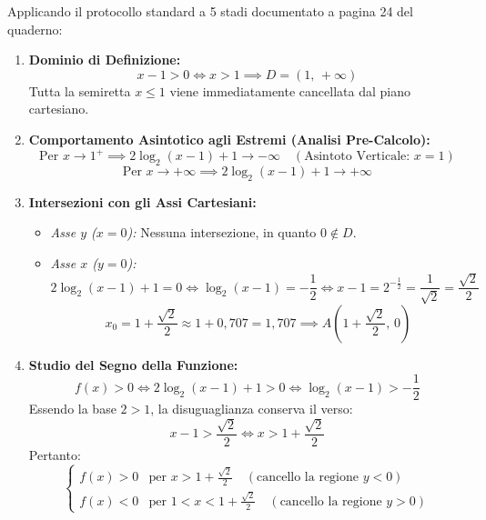 \documentclass[11pt,a4paper,oneside]{report}
\begin{document}
Applicando il protocollo standard a 5 stadi documentato a pagina 24 del quaderno:
\begin{enumerate}
\item \textbf{Dominio di Definizione:}
\begin{equation}
x - 1 > 0 \iff x > 1 \implies D = (1, \, +\infty)
\end{equation}
Tutta la semiretta $x \le 1$ viene immediatamente cancellata dal piano cartesiano.

\item \textbf{Comportamento Asintotico agli Estremi (Analisi Pre-Calcolo):}
\begin{equation}
\text{Per } x \to 1^+ \implies 2\log_2(x - 1) + 1 \to -\infty \quad (\text{Asintoto Verticale: } x = 1)
\end{equation}
\begin{equation}
\text{Per } x \to +\infty \implies 2\log_2(x - 1) + 1 \to +\infty
\end{equation}

\item \textbf{Intersezioni con gli Assi Cartesiani:}
\begin{itemize}
\item \textit{Asse $y$ ($x = 0$):} Nessuna intersezione, in quanto $0 \notin D$.
\item \textit{Asse $x$ ($y = 0$):}
\begin{equation}
2\log_2(x - 1) + 1 = 0 \iff \log_2(x - 1) = -\frac{1}{2} \iff x - 1 = 2^{-\frac{1}{2}} = \frac{1}{\sqrt{2}} = \frac{\sqrt{2}}{2}
\end{equation}
\begin{equation}
x_0 = 1 + \frac{\sqrt{2}}{2} \approx 1 + 0{,}707 = 1{,}707 \implies A\left(1 + \frac{\sqrt{2}}{2}, \, 0\right)
\end{equation}
\end{itemize}

\item \textbf{Studio del Segno della Funzione:}
\begin{equation}
f(x) > 0 \iff 2\log_2(x - 1) + 1 > 0 \iff \log_2(x - 1) > -\frac{1}{2}
\end{equation}
Essendo la base $2 > 1$, la disuguaglianza conserva il verso:
\begin{equation}
x - 1 > \frac{\sqrt{2}}{2} \iff x > 1 + \frac{\sqrt{2}}{2}
\end{equation}
Pertanto:
\begin{equation}
\begin{cases}
f(x) > 0 & \text{per } x > 1 + \frac{\sqrt{2}}{2} \quad (\text{cancello la regione } y < 0)\\[4pt]
f(x) < 0 & \text{per } 1 < x < 1 + \frac{\sqrt{2}}{2} \quad (\text{cancello la regione } y > 0)
\end{cases}
\end{equation}
\end{enumerate}
\end{document}
